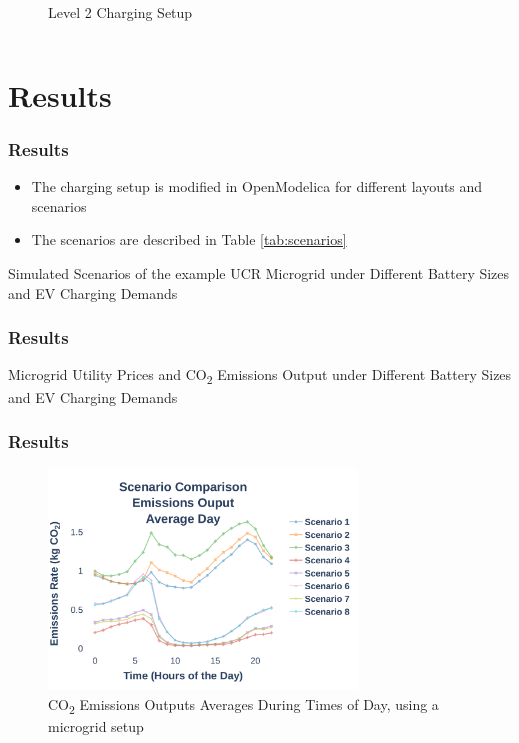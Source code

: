 \documentclass[aspectratio=169, 8 pt]{beamer}
\begin{document}
\begin{frame}
\begin{columns}
\begin{column}{0.5\linewidth}
\begin{block}{}
\begin{figure}
						\caption{Level 2 Charging Setup}
						\label{fig:level2cert}
					\end{figure}
				\end{block}
			\end{column}
		\end{columns}
	\end{frame}
	
	\section{Results}	
	
	\begin{frame}
		\frametitle{Results}
		\begin{itemize}
			\item The charging setup is modified in OpenModelica for different layouts and scenarios
			\item The scenarios are described in Table \ref{tab:scenarios}
		\end{itemize}
		
		\begin{table}
			\caption{Simulated Scenarios of the example UCR Microgrid under Different Battery Sizes and EV Charging Demands}
			\large
			
			\normalsize
			\label{tab:scenarios}
		\end{table}
	\end{frame}
	
	\begin{frame}
		\frametitle{Results}
		\begin{table}
			\caption{Microgrid Utility Prices and CO\textsubscript{2} Emissions Output under Different Battery Sizes and EV Charging Demands}
			\centering
				\large
				
			\normalsize
			\label{tab:emissions}
		\end{table}	
	\end{frame}
	
	\begin{frame}
		\frametitle{Results}
		\begin{figure}
			\centering
			\includegraphics[width=0.73\textwidth]{Fig/Option_3/emissions_scenario_comparison_run_3_large_font.pdf}
			\caption{\footnotesize  CO\textsubscript{2} Emissions Outputs Averages During Times of Day, using a microgrid setup}
			\label{fig:emissionsscenariocomparison}
		\end{figure}
	\end{frame}
	
\end{document}
